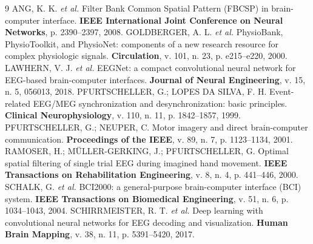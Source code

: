 \documentclass[12pt,a4paper]{article}
\begin{document}

\label{sec:resultados}

\begin{thebibliography}{9}
 ANG, K. K. \textit{et al.} Filter Bank Common Spatial Pattern (FBCSP) in
brain-computer interface. \textbf{IEEE International Joint Conference on Neural Networks},
p. 2390--2397, 2008.
 GOLDBERGER, A. L. \textit{et al.} PhysioBank, PhysioToolkit, and
PhysioNet: components of a new research resource for complex physiologic signals.
\textbf{Circulation}, v. 101, n. 23, p. e215--e220, 2000.
 LAWHERN, V. J. \textit{et al.} EEGNet: a compact convolutional neural
network for EEG-based brain-computer interfaces. \textbf{Journal of Neural Engineering},
v. 15, n. 5, 056013, 2018.
 PFURTSCHELLER, G.; LOPES DA SILVA, F. H. Event-related EEG/MEG
synchronization and desynchronization: basic principles. \textbf{Clinical Neurophysiology},
v. 110, n. 11, p. 1842--1857, 1999.
 PFURTSCHELLER, G.; NEUPER, C. Motor imagery and direct
brain-computer communication. \textbf{Proceedings of the IEEE}, v. 89, n. 7, p. 1123--1134,
2001.
 RAMOSER, H.; MÜLLER-GERKING, J.; PFURTSCHELLER, G. Optimal spatial
filtering of single trial EEG during imagined hand movement. \textbf{IEEE Transactions on
Rehabilitation Engineering}, v. 8, n. 4, p. 441--446, 2000.
 SCHALK, G. \textit{et al.} BCI2000: a general-purpose brain-computer
interface (BCI) system. \textbf{IEEE Transactions on Biomedical Engineering}, v. 51, n. 6,
p. 1034--1043, 2004.
 SCHIRRMEISTER, R. T. \textit{et al.} Deep learning with
convolutional neural networks for EEG decoding and visualization. \textbf{Human Brain
Mapping}, v. 38, n. 11, p. 5391--5420, 2017.
\end{thebibliography}
\end{document}

